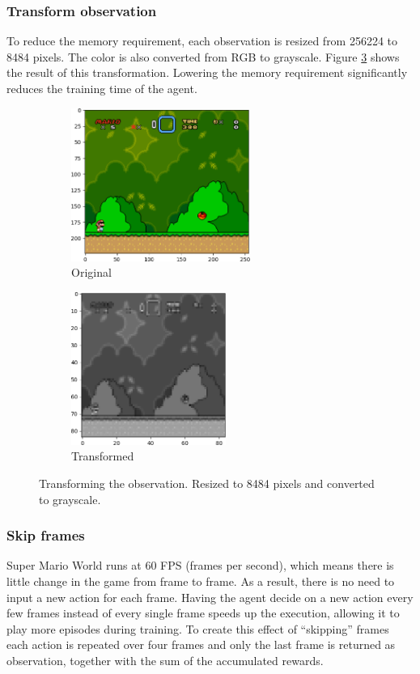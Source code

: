 \documentclass[a4paper]{article}
\begin{document}
\subsubsection{Transform observation}
To reduce the memory requirement, each observation is resized from 256\texttimes{}224 to 84\texttimes{}84 pixels.
The color is also converted from RGB to grayscale.
Figure \ref{fig:transformation} shows the result of this transformation.
Lowering the memory requirement significantly reduces the training time of the agent.
\begin{figure}[htbp]
    \centering
    \begin{subfigure}{.5\textwidth}
        \centering
        \includegraphics[height=5cm]{original}
        \caption{Original}
        \label{fig:transformation:sub1}
    \end{subfigure}%
    \begin{subfigure}{.5\textwidth}
        \centering
        \includegraphics[height=5cm]{grayscale}
        \caption{Transformed}
        \label{fig:transformation:sub2}
    \end{subfigure}
    \caption{Transforming the observation. Resized to 84\texttimes{}84 pixels and converted to grayscale.}
    \label{fig:transformation}
\end{figure}

\subsubsection{Skip frames}
Super Mario World runs at 60 FPS (frames per second), which means there is little change in the game from frame to frame.
As a result, there is no need to input a new action for each frame.
Having the agent decide on a new action every few frames instead of every single frame speeds up the execution, allowing it to play more episodes during training.
To create this effect of ``skipping'' frames each action is repeated over four frames and only the last frame is returned as observation, together with the sum of the accumulated rewards.
\end{document}
